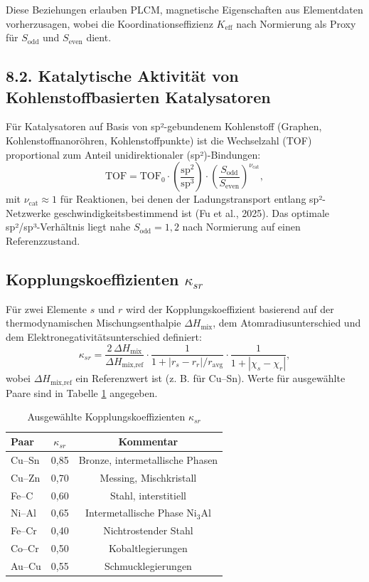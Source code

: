 \documentclass[12pt,a4paper]{article}
\begin{document}
Diese Beziehungen erlauben PLCM, magnetische Eigenschaften aus Elementdaten vorherzusagen, wobei die Koordinationseffizienz \(K_{\text{eff}}\) nach Normierung als Proxy für \(S_{\text{odd}}\) und \(S_{\text{even}}\) dient.

\subsection*{8.2. Katalytische Aktivität von Kohlenstoffbasierten Katalysatoren}
Für Katalysatoren auf Basis von sp²-gebundenem Kohlenstoff (Graphen, Kohlenstoffnanoröhren, Kohlenstoffpunkte) ist die Wechselzahl (TOF) proportional zum Anteil unidirektionaler (sp²)-Bindungen:
\[
\text{TOF} = \text{TOF}_0 \cdot \left( \frac{\text{sp}^2}{\text{sp}^3} \right) \cdot \left( \frac{S_{\text{odd}}}{S_{\text{even}}} \right)^{\nu_{\text{cat}}},
\]
mit \(\nu_{\text{cat}} \approx 1\) für Reaktionen, bei denen der Ladungstransport entlang sp²-Netzwerke geschwindigkeitsbestimmend ist (Fu et al., 2025). Das optimale sp²/sp³-Verhältnis liegt nahe \(S_{\text{odd}} = 1,2\) nach Normierung auf einen Referenzzustand.

\subsection{Kopplungskoeffizienten \(\kappa_{sr}\)}

Für zwei Elemente \(s\) und \(r\) wird der Kopplungskoeffizient basierend auf der thermodynamischen Mischungsenthalpie \(\Delta H_{\text{mix}}\), dem Atomradiusunterschied und dem Elektronegativitätsunterschied definiert:
\[
\kappa_{sr} = \frac{2\,\Delta H_{\text{mix}}}{\Delta H_{\text{mix,ref}}} \cdot
\frac{1}{1 + |r_s - r_r|/r_{\text{avg}}} \cdot
\frac{1}{1 + |\chi_s - \chi_r|},
\]
wobei \(\Delta H_{\text{mix,ref}}\) ein Referenzwert ist (z. B. für Cu–Sn). Werte für ausgewählte Paare sind in Tabelle \ref{tab:kappa} angegeben.

\begin{table}[htbp]
	\centering
	\caption{Ausgewählte Kopplungskoeffizienten \(\kappa_{sr}\)}
	\label{tab:kappa}
	\begin{tabular}{lcc}
		\toprule
		Paar & \(\kappa_{sr}\) & Kommentar \\
		\midrule
		Cu–Sn & 0,85 & Bronze, intermetallische Phasen \\
		Cu–Zn & 0,70 & Messing, Mischkristall \\
		Fe–C  & 0,60 & Stahl, interstitiell \\
		Ni–Al & 0,65 & Intermetallische Phase Ni\(_{3}\)Al \\
		Fe–Cr & 0,40 & Nichtrostender Stahl \\
		Co–Cr & 0,50 & Kobaltlegierungen \\
		Au–Cu & 0,55 & Schmucklegierungen \\
		\bottomrule
	\end{tabular}
\end{table}
\end{document}
